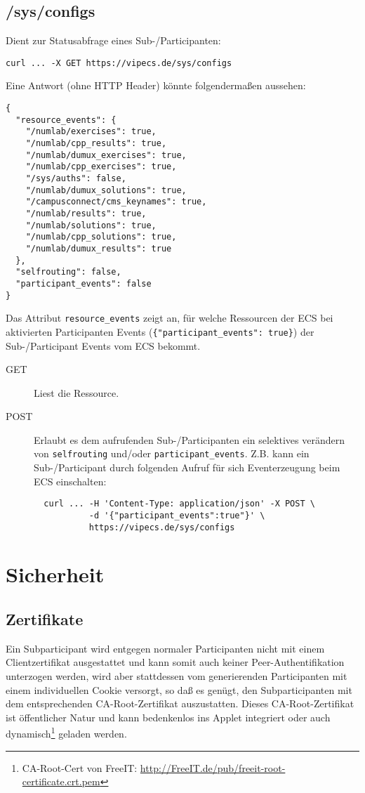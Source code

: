 \documentclass[dvips,12pt,a4paper]{article}
\begin{document}
\subsection{/sys/configs}
Dient zur Statusabfrage eines Sub-/Participanten:
\begin{verbatim}
curl ... -X GET https://vipecs.de/sys/configs
\end{verbatim}
Eine Antwort (ohne HTTP Header) könnte folgendermaßen aussehen:
\begin{verbatim}
{
  "resource_events": {
    "/numlab/exercises": true,
    "/numlab/cpp_results": true,
    "/numlab/dumux_exercises": true,
    "/numlab/cpp_exercises": true,
    "/sys/auths": false,
    "/numlab/dumux_solutions": true,
    "/campusconnect/cms_keynames": true,
    "/numlab/results": true,
    "/numlab/solutions": true,
    "/numlab/cpp_solutions": true,
    "/numlab/dumux_results": true
  },
  "selfrouting": false,
  "participant_events": false
}
\end{verbatim}
Das Attribut \texttt{resource\_events} zeigt an, für welche Ressourcen der ECS
bei aktivierten Participanten Events (\verb#{"participant_events": true}#)
der Sub-/Participant Events vom ECS bekommt.
\begin{description}
  \item[GET] Liest die Ressource.
  \item[POST] Erlaubt es dem aufrufenden Sub-/Participanten  ein selektives
  verändern von \texttt{selfrouting} und/oder \texttt{participant\_events}.
  Z.B. kann ein Sub-/Participant durch folgenden Aufruf für sich Eventerzeugung
  beim ECS einschalten:
  \begin{verbatim}
  curl ... -H 'Content-Type: application/json' -X POST \
           -d '{"participant_events":true"}' \
           https://vipecs.de/sys/configs
  \end{verbatim}
\end{description}

\section{Sicherheit}
\subsection{Zertifikate}
Ein Subparticipant wird entgegen normaler Participanten nicht mit einem
Clientzertifikat ausgestattet und kann somit auch keiner Peer-Authentifikation
unterzogen werden, wird aber stattdessen vom generierenden Participanten mit
einem individuellen Cookie versorgt, so daß es genügt, den Subparticipanten mit
dem entsprechenden CA-Root-Zertifikat auszustatten. Dieses CA-Root-Zertifikat
ist öffentlicher Natur und kann bedenkenlos ins Applet integriert oder auch
dynamisch\footnote{CA-Root-Cert von FreeIT:
\url{http://FreeIT.de/pub/freeit-root-certificate.crt.pem}} geladen werden.
\end{document}
